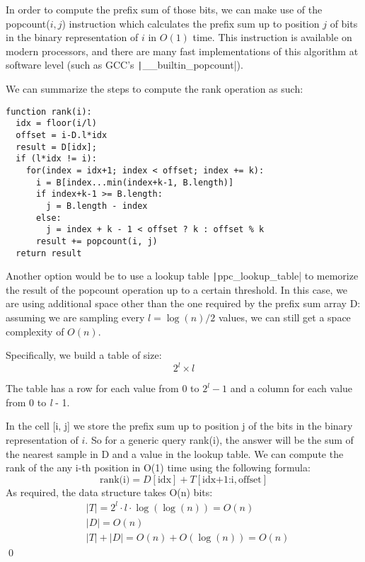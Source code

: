 \documentclass{article}
\DeclarePairedDelimiter\floor{\lfloor}{\rfloor}
\begin{document}
In order to compute the prefix sum of those bits, we can make use of the popcount(\(i, j\))
instruction which calculates the prefix sum up to position \(j\) of bits in the binary representation
of \(i\) in \(O(1)\) time. This instruction is available on modern processors, and there are many
fast implementations of this algorithm at software level (such as GCC's
\texttt|__builtin_popcount|).

\pagebreak
We can summarize the steps to compute the rank operation as such:
\begin{verbatim}
function rank(i):
  idx = floor(i/l)
  offset = i-D.l*idx
  result = D[idx];
  if (l*idx != i):
    for(index = idx+1; index < offset; index += k):
      i = B[index...min(index+k-1, B.length)]
      if index+k-1 >= B.length:
        j = B.length - index
      else:
        j = index + k - 1 < offset ? k : offset % k
      result += popcount(i, j)
  return result
\end{verbatim}

Another option would be to use a lookup table \texttt|ppc_lookup_table| to memorize the result of
the popcount operation up to a certain threshold. In this case, we are using additional space
other than the one required by the prefix sum array D: assuming we are sampling every \(l=\log(n)/2\)
values, we can still get a space complexity of \(O(n)\).

Specifically, we build a table of size:
\[
    2^\textit{l} \times \textit{l}
\]

The table has a row for each value from 0 to \(2^l - 1\) and a column for each value from 0 to \textit{l} - 1. 

In the cell [i, j]  we store the prefix sum up to position j of the bits in the binary representation of \(i\).
%
So for a generic query rank(i), the answer will be the sum of the nearest sample in D and a value in the lookup table.
%
We can compute the rank of the any i-th position in O(1)
time using the following formula:
\[
    \text{rank(i)} = D[\text{idx}] + T[\text{idx+1:i}, \text{offset}]
\]
%    
As required, the data structure takes O(n) bits: 
\[
    \begin{aligned}
        &|T| = 2^l \cdot l \cdot \log(\log (n)) = O(n) \\
        &|D| = O(n) \\
        &|T| + |D| = O(n) + O(\log(n)) = O(n)
    \end{aligned}
\] \qed
%
\end{document}
